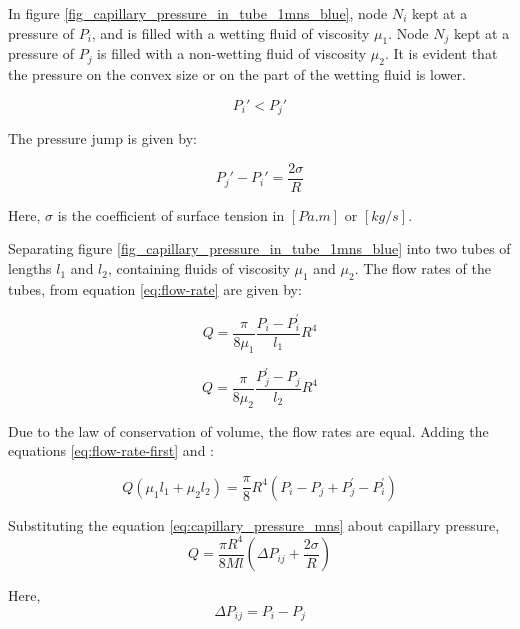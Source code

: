 	In figure \ref{fig_capillary_pressure_in_tube_1mns_blue}, node $N_{i}$ kept at a pressure of $P_{i}$, and is filled with a wetting fluid of viscosity $\mu_{1}$. Node $N_{j}$ kept at a pressure of $P_{j}$ is filled with a non-wetting fluid of viscosity $\mu_{2}$. It is evident that the pressure on the convex size or on the part of the wetting fluid is lower.
	
	\begin{equation}
		P_{i}' < P_{j}'
	\end{equation}
	
	The pressure jump is given by:
	
	\begin{equation} \label{eq:capillary_pressure_mns}
		P_{j}' - P_{i}' = \frac{2 \sigma}{R}
	\end{equation}
	
	Here, $\sigma$ is the coefficient of surface tension in $[Pa.m]$ or $[kg/s]$.
	
	Separating figure \ref{fig_capillary_pressure_in_tube_1mns_blue} into two tubes of lengths $l_{1}$ and $l_{2}$, containing fluids of viscosity ${\mu}_1$ and ${\mu}_2$. The flow rates of the tubes, from equation \ref{eq:flow-rate} are given by:
	
	\begin{equation} \label{eq:flow-rate-first}
		Q = \frac{\pi}{8{\mu}_1} \frac{P_i - P^{'}_i}{l_1} R^4
	\end{equation}
	
	\begin{equation} \label{eq:flow-rate-second}
		Q = \frac{\pi}{8{\mu}_2} \frac{P^{'}_j - P_j}{l_2} R^4
	\end{equation}
	
	Due to the law of conservation of volume, the flow rates are equal. Adding the equations \ref{eq:flow-rate-first} and \label{eq:flow-rate-second}:
	
	\begin{equation} \label{eq:flow-rate-intermediate}
		Q({\mu}_1 l_1 + {\mu}_2 l_2) = \frac{\pi}{8}R^4(P_i - P_j + P^{'}_j - P^{'}_i)
	\end{equation}
	
	Substituting the equation \ref{eq:capillary_pressure_mns} about capillary pressure,
	\begin{equation} \label{eq:flow-rate-1mns-basic-m}
		Q = \frac{\pi R^4}{8Ml} \left( \Delta P_{ij} + \frac{2\sigma}{R} \right)
	\end{equation}
	
	Here,
	\begin{equation} \label{eq:def-pressure-difference} 
		\Delta P_{ij} = P_{i} - P_{j}
	\end{equation}
	
